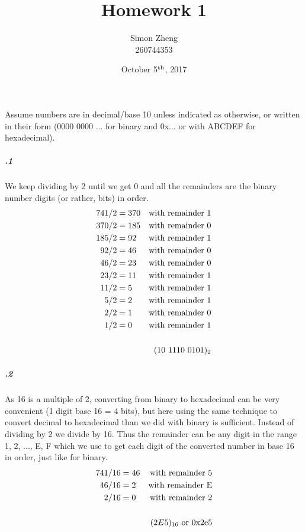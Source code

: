 \documentclass[11pt,letterpaper]{article}
\author{Simon Zheng\\260744353}
\title{Homework 1}
\date{October 5$^{\textnormal{th}}$, 2017}
\begin{document}
	\maketitle
	\thispagestyle{fancy}
	
	\section{}
	Assume numbers are in decimal/base 10 unless indicated as otherwise, or written in their form (0000 0000 ... for binary and 0x... or with ABCDEF for hexadecimal).
	
		\subparagraph{.1}
		We keep dividing by 2 until we get 0 and all the remainders are the binary number digits (or rather, bits) in order.
		\begin{align*}
		741 / 2 &= 370&\textnormal{with remainder 1}\\
		370 / 2 &= 185&\textnormal{with remainder 0}\\
		185 / 2 &=  92&\textnormal{with remainder 1}\\
		 92 / 2 &=  46&\textnormal{with remainder 0}\\
		 46 / 2 &=  23&\textnormal{with remainder 0}\\
		 23 / 2 &=  11&\textnormal{with remainder 1}\\
		 11 / 2 &=   5&\textnormal{with remainder 1}\\
		  5 / 2 &=   2&\textnormal{with remainder 1}\\
		  2 / 2 &=   1&\textnormal{with remainder 0}\\
		  1 / 2 &=   0&\textnormal{with remainder 1}\\
		\\
		&&(10\ 1110\ 0101)_2
		\end{align*}
		
		\subparagraph{.2}
		As 16 is a multiple of 2, converting from binary to hexadecimal can be very convenient (1 digit base 16 = 4 bits), but here using the same technique to convert decimal to hexadecimal than we did with binary is sufficient. Instead of dividing by 2 we divide by 16. Thus the remainder can be any digit in the range 1, 2, ..., E, F which we use to get each digit of the converted number in base 16 in order, just like for binary.
		\begin{align*}
		741 / 16 &= 46&\textnormal{with remainder 5}\\
		 46 / 16 &=  2&\textnormal{with remainder E}\\
		  2 / 16 &=  0&\textnormal{with remainder 2}\\
		\\
		&&(2E5)_{16}\textnormal{ or 0x2e5}
		\end{align*}
		
\end{document}
